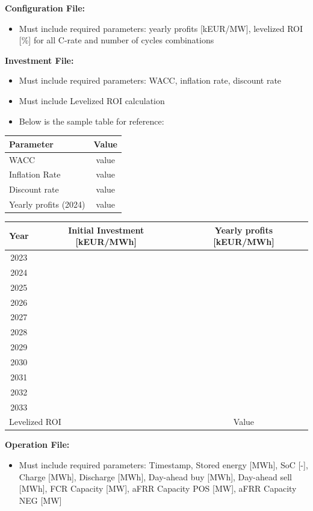 \documentclass[11pt,a4paper]{article}
\begin{document}
\textbf{Configuration File:}
\begin{itemize}
    \item Must include required parameters: yearly profits [kEUR/MW], levelized ROI [\%] for all C-rate and number of cycles combinations
\end{itemize}

\textbf{Investment File:}
\begin{itemize}
    \item Must include required parameters: WACC, inflation rate, discount rate
    \item Must include Levelized ROI calculation
    \item Below is the sample table for reference:
\end{itemize}

\begin{table}[h!]
\centering
\begin{tabular}{|l|c|}
\hline
\textbf{Parameter} & \textbf{Value} \\
\hline
WACC & value \\
\hline
Inflation Rate & value \\
\hline
Discount rate & value \\
\hline
Yearly profits (2024) & value \\
\hline
\end{tabular}
\end{table}

\begin{table}[h!]
\centering
\begin{tabular}{|c|c|c|}
\hline
\textbf{Year} & \textbf{Initial Investment [kEUR/MWh]} & \textbf{Yearly profits [kEUR/MWh]} \\
\hline
2023 & & \\
2024 & & \\
2025 & & \\
2026 & & \\
2027 & & \\
2028 & & \\
2029 & & \\
2030 & & \\
2031 & & \\
2032 & & \\
2033 & & \\
\hline
\multicolumn{2}{|l|}{Levelized ROI} & Value \\
\hline
\end{tabular}
\end{table}

\textbf{Operation File:}
\begin{itemize}
    \item Must include required parameters: Timestamp, Stored energy [MWh], SoC [-], Charge [MWh], Discharge [MWh], Day-ahead buy [MWh], Day-ahead sell [MWh], FCR Capacity [MW], aFRR Capacity POS [MW], aFRR Capacity NEG [MW]
\end{itemize}
\end{document}
